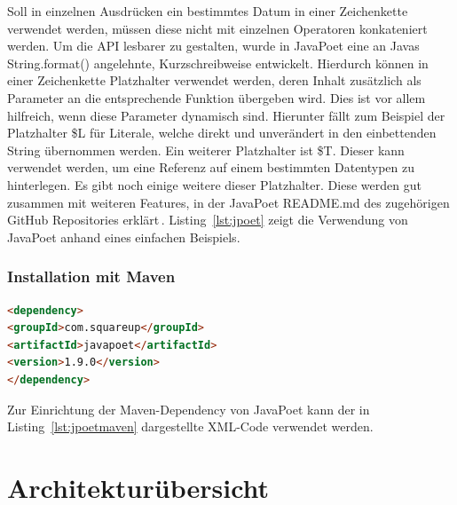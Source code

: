\documentclass[12pt,oneside,a4paper,parskip]{scrbook}
\begin{document}
Soll in einzelnen Ausdrücken ein bestimmtes Datum in einer Zeichenkette verwendet werden, müssen diese nicht mit einzelnen Operatoren konkateniert werden. Um die API lesbarer zu gestalten, wurde in JavaPoet eine an Javas String.format() angelehnte, Kurzschreibweise entwickelt. Hierdurch können in einer Zeichenkette Platzhalter verwendet werden, deren Inhalt zusätzlich als Parameter an die entsprechende Funktion übergeben wird. Dies ist vor allem hilfreich, wenn diese Parameter dynamisch sind. Hierunter fällt zum Beispiel der Platzhalter \$L für Literale, welche direkt und unverändert in den einbettenden String übernommen werden. Ein weiterer Platzhalter ist \$T. Dieser kann verwendet werden, um eine Referenz auf einem bestimmten Datentypen zu hinterlegen. Es gibt noch einige weitere dieser Platzhalter. Diese werden gut zusammen mit weiteren Features, in der JavaPoet README.md des zugehörigen GitHub Repositories erklärt\,\cite{javapoet2017}. Listing~\ref{lst:jpoet} zeigt die Verwendung von JavaPoet anhand eines einfachen Beispiels.

\subsubsection{Installation mit Maven}

\begin{lstlisting}[label=lst:jpoetmaven,
language=HTML,
firstnumber=1,
caption=XML-Code zum Einbinden von JavaPoet als Maven-Dependency.]
<dependency>
<groupId>com.squareup</groupId>
<artifactId>javapoet</artifactId>
<version>1.9.0</version>
</dependency>
\end{lstlisting}

Zur Einrichtung der Maven-Dependency von JavaPoet kann der in Listing~\ref{lst:jpoetmaven} dargestellte XML-Code verwendet werden.

\section{Architekturübersicht}
\end{document}
